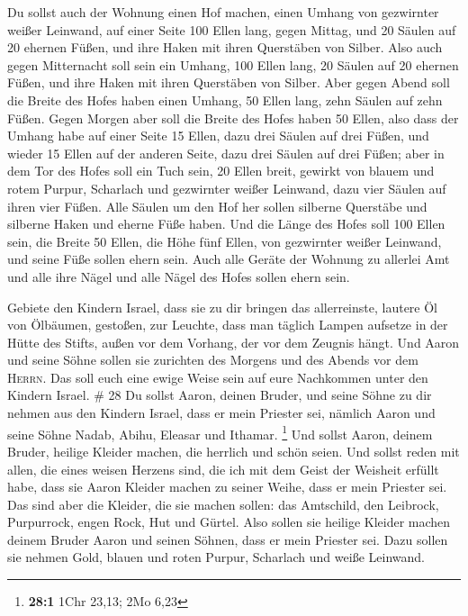  Du sollst auch der Wohnung einen Hof machen, einen Umhang
von gezwirnter weißer Leinwand, auf einer Seite 100 Ellen lang, gegen
Mittag,  und 20 Säulen auf 20 ehernen Füßen, und ihre
Haken mit ihren Querstäben von Silber.  Also auch gegen
Mitternacht soll sein ein Umhang, 100 Ellen lang, 20 Säulen auf 20
ehernen Füßen, und ihre Haken mit ihren Querstäben von Silber.
 Aber gegen Abend soll die Breite des Hofes haben einen
Umhang, 50 Ellen lang, zehn Säulen auf zehn Füßen.  Gegen
Morgen aber soll die Breite des Hofes haben 50 Ellen, 
also dass der Umhang habe auf einer Seite 15 Ellen, dazu drei Säulen auf
drei Füßen,  und wieder 15 Ellen auf der anderen Seite,
dazu drei Säulen auf drei Füßen;  aber in dem Tor des
Hofes soll ein Tuch sein, 20 Ellen breit, gewirkt von blauem und rotem
Purpur, Scharlach und gezwirnter weißer Leinwand, dazu vier Säulen auf
ihren vier Füßen.  Alle Säulen um den Hof her sollen
silberne Querstäbe und silberne Haken und eherne Füße haben.
 Und die Länge des Hofes soll 100 Ellen sein, die Breite
50 Ellen, die Höhe fünf Ellen, von gezwirnter weißer Leinwand, und seine
Füße sollen ehern sein.  Auch alle Geräte der Wohnung zu
allerlei Amt und alle ihre Nägel und alle Nägel des Hofes sollen ehern
sein.

 Gebiete den Kindern Israel, dass sie zu dir bringen das
allerreinste, lautere Öl von Ölbäumen, gestoßen, zur Leuchte, dass man
täglich Lampen aufsetze  in der Hütte des Stifts, außen
vor dem Vorhang, der vor dem Zeugnis hängt. Und Aaron und seine Söhne
sollen sie zurichten des Morgens und des Abends vor dem \textsc{Herrn}.
Das soll euch eine ewige Weise sein auf eure Nachkommen unter den
Kindern Israel. \# 28  Du sollst Aaron, deinen Bruder, und
seine Söhne zu dir nehmen aus den Kindern Israel, dass er mein Priester
sei, nämlich Aaron und seine Söhne Nadab, Abihu, Eleasar und Ithamar.
\footnote{\textbf{28:1} 1Chr 23,13; 2Mo 6,23}  Und sollst
Aaron, deinem Bruder, heilige Kleider machen, die herrlich und schön
seien.  Und sollst reden mit allen, die eines weisen
Herzens sind, die ich mit dem Geist der Weisheit erfüllt habe, dass sie
Aaron Kleider machen zu seiner Weihe, dass er mein Priester sei.
 Das sind aber die Kleider, die sie machen sollen: das
Amtschild, den Leibrock, Purpurrock, engen Rock, Hut und Gürtel. Also
sollen sie heilige Kleider machen deinem Bruder Aaron und seinen Söhnen,
dass er mein Priester sei.  Dazu sollen sie nehmen Gold,
blauen und roten Purpur, Scharlach und weiße Leinwand.

